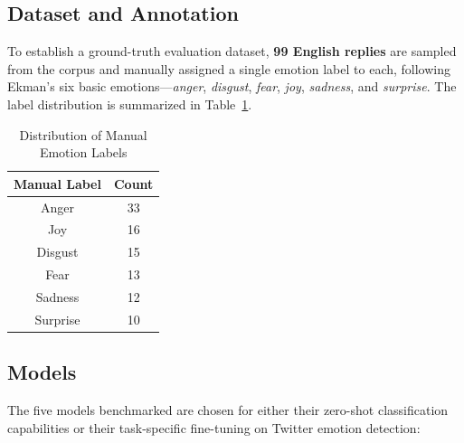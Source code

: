\subsection{Dataset and Annotation}

To establish a ground-truth evaluation dataset, \textbf{99 English replies} are sampled from the corpus and manually assigned a single emotion label to each, following Ekman’s six basic emotions—\textit{anger}, \textit{disgust}, \textit{fear}, \textit{joy}, \textit{sadness}, and \textit{surprise}. The label distribution is summarized in Table~\ref{tab:manual_label_distribution}.

\begin{table}[ht]
    \centering
    \begin{tabular}{|c|c|}
        \hline
        \textbf{Manual Label} & \textbf{Count} \\
        \hline
        Anger     & 33 \\
        Joy       & 16 \\
        Disgust   & 15 \\
        Fear      & 13 \\
        Sadness   & 12 \\
        Surprise  & 10 \\
        \hline
    \end{tabular}
    \caption{Distribution of Manual Emotion Labels}
    \label{tab:manual_label_distribution}
\end{table}

\subsection{Models}

The five models benchmarked are chosen for either their zero-shot classification capabilities or their task-specific fine-tuning on Twitter emotion detection:

